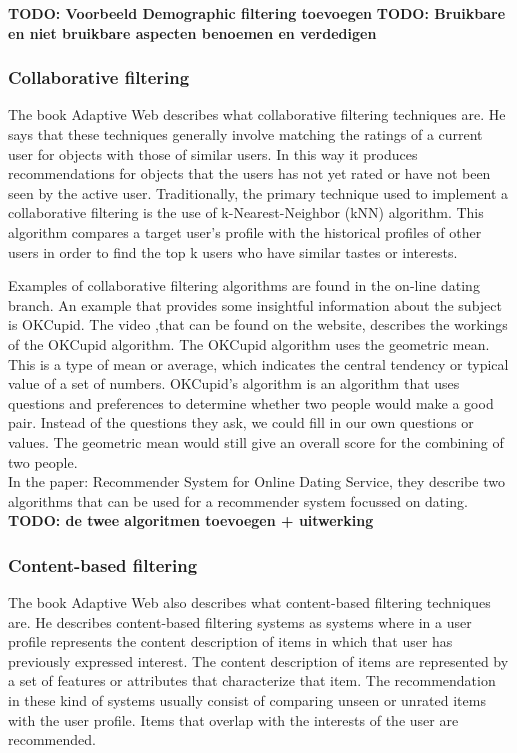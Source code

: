 \documentclass[]{article}
\newcommand{\TODO}[1]{{\color{red}\textbf{TODO: #1}}}
\begin{document}
\TODO{Voorbeeld Demographic filtering toevoegen}
\TODO{Bruikbare en niet bruikbare aspecten benoemen en verdedigen}

\subsubsection{Collaborative filtering}
The book Adaptive Web \citep{Peter2007} describes what collaborative filtering techniques are.
He says that these techniques generally involve matching the ratings of a current user for objects with those of similar users.
In this way it produces recommendations for objects that the users has not yet rated or have not been seen by the active user.
Traditionally, the primary technique used to implement a collaborative filtering is the use of k-Nearest-Neighbor (kNN) algorithm.
This algorithm compares a target user's profile with the historical profiles of other users in order to find the top k users who have similar tastes or interests.

Examples of collaborative filtering algorithms are found in the on-line dating branch.
An example that provides some insightful information about the subject is OKCupid.
The video ,that can be found on the website\cite{okcupid}, describes the workings of the OKCupid algorithm.
The OKCupid algorithm uses the geometric mean.
This is a type of mean or average, which indicates the central tendency or typical value of a set of numbers.
OKCupid's algorithm is an algorithm that uses questions and preferences to determine whether two people would make a good pair.
Instead of the questions they ask, we could fill in our own questions or values.
The geometric mean would still give an overall score for the combining of two people.\\

In the paper: Recommender System for Online Dating Service\cite{lukas07}, they describe two algorithms that can be used for a recommender system focussed on dating.
\TODO{de twee algoritmen toevoegen + uitwerking}


\subsubsection{Content-based filtering}
The book Adaptive Web \citep{Peter2007} also describes what content-based filtering techniques are.
He describes content-based filtering systems as systems where in a user profile represents the content description of items in which that user has previously expressed interest.
The content description of items are represented by a set of features or attributes that characterize that item.
The recommendation in these kind of systems usually consist of comparing unseen or unrated items with the user profile.
Items that overlap with the interests of the user are recommended.
\end{document}

